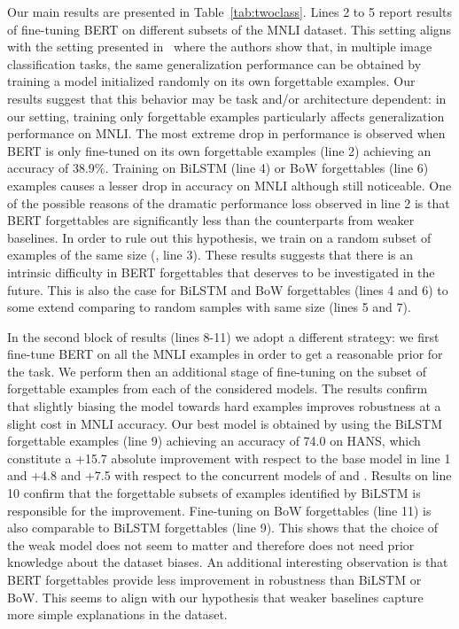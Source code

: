 Our main results are presented in Table~\ref{tab:twoclass}. Lines 2 to 5 report results of fine-tuning BERT on different subsets of the MNLI dataset. This setting aligns with the setting presented in~\cite{toneva2018empirical} where the authors show that, in multiple image classification tasks, the same generalization performance can be obtained by training a model initialized randomly on its own forgettable examples. Our results suggest that this behavior may be task and/or architecture dependent: in our setting, training only forgettable examples particularly affects generalization performance on MNLI. The most extreme drop in performance is observed when BERT is only fine-tuned on its own forgettable examples (line 2) achieving an accuracy of 38.9\%. Training on BiLSTM (line 4) or BoW forgettables (line 6) examples causes a lesser drop in accuracy on MNLI although still noticeable. One of the possible reasons of the dramatic performance loss observed in line 2 is that BERT forgettables are significantly less than the counterparts from weaker baselines. 
In order to rule out this hypothesis, we train on a random subset of examples of the same size (\balancedbert, line 3). These results suggests that there is an intrinsic difficulty in BERT forgettables that deserves to be investigated in the future.
This is also the case for BiLSTM and BoW forgettables (lines 4 and 6) to some extend comparing to random samples with same size (lines 5 and 7).

In the second block of results (lines 8-11) we adopt a different strategy: we first fine-tune BERT on all the MNLI examples in order to get a reasonable prior for the task. We perform then an additional stage of fine-tuning on the subset of forgettable examples from each of the considered models. The results confirm that slightly biasing the model towards hard examples improves robustness at a slight cost in MNLI accuracy. 
Our best model is obtained by using the BiLSTM forgettable examples (line 9) achieving an accuracy of 74.0 on HANS, 
which constitute a +15.7 absolute improvement with respect to the base model in line 1 and +4.8 and +7.5 with respect to the concurrent models of  and . 
Results on line 10 confirm that the forgettable subsets of examples identified by BiLSTM is responsible for the improvement. 
Fine-tuning on BoW forgettables (line 11) is also comparable to BiLSTM forgettables (line 9). This shows that the choice of the weak model 
does not seem to matter and therefore does not need prior knowledge about the dataset biases.
An additional interesting observation is that BERT forgettables provide less improvement in robustness than BiLSTM or BoW. 
This seems to align with our hypothesis that weaker baselines capture more simple explanations in the dataset.





